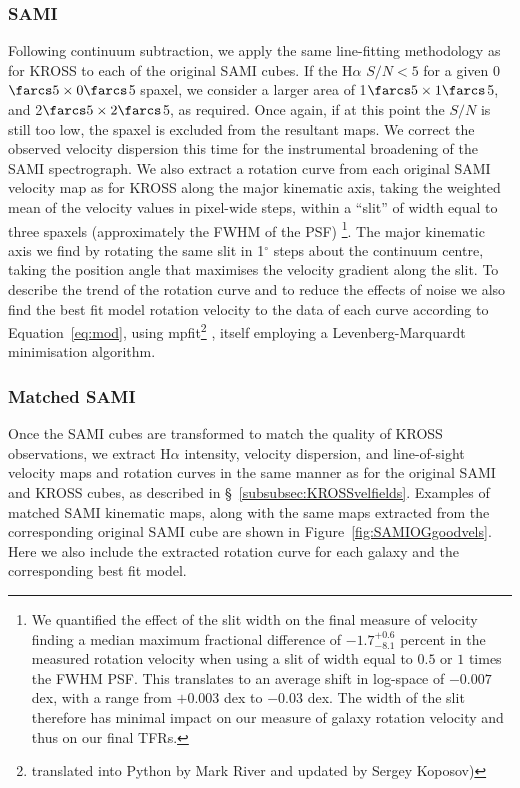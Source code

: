\documentclass[a4paper,fleqn,usenatbib]{mnras}
\begin{document}
{\subsubsection{SAMI}
\label{subsubsec:HIGHQvelfields}

Following continuum subtraction, we apply the same line-fitting methodology as for KROSS to each of the original SAMI cubes. If the H$\alpha$ $S/N < 5$ for a given 0$\farcs5 \times 0\farcs $5 spaxel, we consider a larger area of  1$\farcs5 \times 1\farcs $5, and 2$\farcs5 \times 2\farcs $5, as required. Once again, if at this point the $S/N$ is still too low, the spaxel is excluded from the resultant maps. We correct the observed velocity dispersion this time for the instrumental broadening of the SAMI spectrograph. We also extract a rotation curve from each original SAMI velocity map as for KROSS along the major kinematic axis, taking the weighted mean of the velocity values in pixel-wide steps, within a ``slit'' of width equal to three spaxels (approximately the FWHM of the PSF) \footnote{We quantified the effect of the slit width on the final measure of velocity finding a median maximum fractional difference of $-1.7^{+0.6}_{-8.1}$ percent in the measured rotation velocity when using a slit of width equal to $0.5$ or $1$ times the FWHM PSF. This translates to an average shift in log-space of $-0.007$ dex, with a range from $+0.003$ dex to $-0.03$ dex. The width of the slit therefore has minimal impact on our measure of galaxy rotation velocity and thus on our final TFRs.}. The major kinematic axis we find by rotating the same slit in 1$^{\circ}$ steps about the continuum centre, taking the position angle that maximises the velocity gradient along the slit. To describe the trend of the rotation curve and to reduce the effects of noise we also find the best fit model rotation velocity to the data of each curve according to Equation~\ref{eq:mod}, using {\sc mpfit}\footnote{translated into {\sc Python} by Mark River and updated by Sergey Koposov)} \citep{Markwardt:2009}, itself employing a Levenberg-Marquardt minimisation algorithm.  


\subsubsection{Matched SAMI}
\label{subsubsec:SAMIvelfields}

Once the SAMI cubes are transformed to match the quality of KROSS observations, we extract H$\alpha$ intensity, velocity dispersion, and line-of-sight velocity maps and rotation curves in the same manner as for the original SAMI and KROSS cubes, as described in \S~\ref{subsubsec:KROSSvelfields}. Examples of matched SAMI kinematic maps, along with the same maps extracted from the corresponding original SAMI cube are shown in Figure~\ref{fig:SAMIOGgoodvels}. Here we also include the extracted rotation curve for each galaxy and the corresponding best fit model.

}
\end{document}
